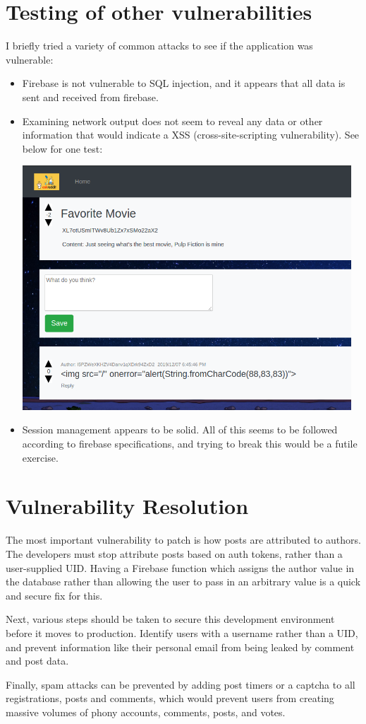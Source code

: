 \section{Testing of other vulnerabilities}
I briefly tried a variety of common attacks to see if the application was vulnerable:
\begin{itemize}
    \item Firebase is not vulnerable to SQL injection, and it appears that all data is sent and received from firebase.
    \item Examining network output does not seem to reveal any data or other information that would indicate a XSS (cross-site-scripting vulnerability). See below for one test:
    
    \includegraphics[width = 350pt]{images/xss.png}

    \item Session management appears to be solid. All of this seems to be followed according to firebase specifications, and trying to break this would be a futile exercise.
\end{itemize}

\section{Vulnerability Resolution}

The most important vulnerability to patch is how posts are attributed to authors. The developers must stop attribute posts based on auth tokens, rather than a user-supplied UID. Having a Firebase function which assigns the author value in the database rather than allowing the user to pass in an arbitrary value is a quick and secure fix for this.

Next, various steps should be taken to secure this development environment before it moves to production. Identify users with a username rather than a UID, and prevent information like their personal email from being leaked by comment and post data.

Finally, spam attacks can be prevented by adding post timers or a captcha to all registrations, posts and comments, which would prevent users from creating massive volumes of phony accounts, comments, posts, and votes.